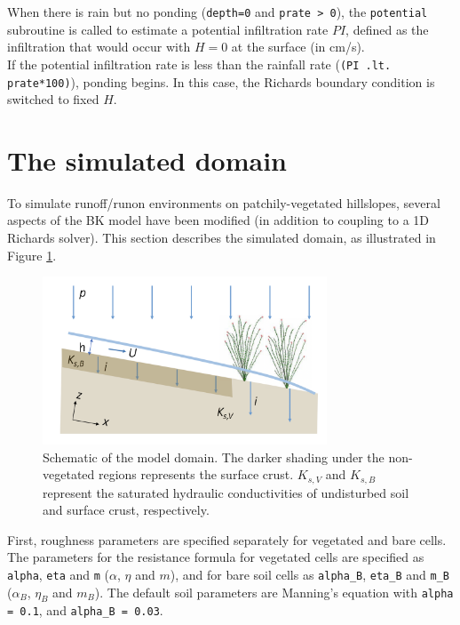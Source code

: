 \documentclass{article}
\newcommand{\code}[1]{\texttt{#1}}
\begin{document}
When there is rain but no ponding (\code{depth=0} and \code{prate > 0}), the  \code{potential} subroutine is called to estimate a potential infiltration rate $PI$, defined as the infiltration that would occur with $H=0$ at the surface (in cm/s). \\  
If the potential infiltration rate is less than the rainfall rate (\code{(PI .lt. prate*100)}), ponding begins.  In this case, the Richards boundary condition is switched to fixed $H$.


	
\section{The simulated domain}
\label{domain}
To simulate runoff/runon environments on patchily-vegetated hillslopes, several aspects of the BK model have been modified (in addition to coupling to a 1D Richards solver).  This section describes the simulated domain, as illustrated in Figure \ref{domain_schematic}.

 \begin{figure}[h]
 \centering
\includegraphics[width=20pc]{grid/domain_schematic.png}
 \caption{Schematic of the model domain.  The darker shading under the non-vegetated regions represents the surface crust.  $K_{s,V}$ and $K_{s,B}$  represent the saturated hydraulic conductivities of undisturbed soil and surface crust, respectively.}
 \label{domain_schematic}
 \end{figure}
 
 
First,  roughness parameters are specified separately for vegetated and bare cells. 
 The parameters for the resistance formula for vegetated cells are specified as  \code{alpha}, \code{eta} and \code{m}  ($\alpha$, $\eta$ and $m$), and for bare soil cells as  \code{alpha\_B}, \code{eta\_B} and \code{m\_B}  ($\alpha_B$, $\eta_B$ and $m_B$).
  The default soil parameters are Manning's equation with \code{alpha = 0.1}, and \code{alpha\_B = 0.03}.
\end{document}
